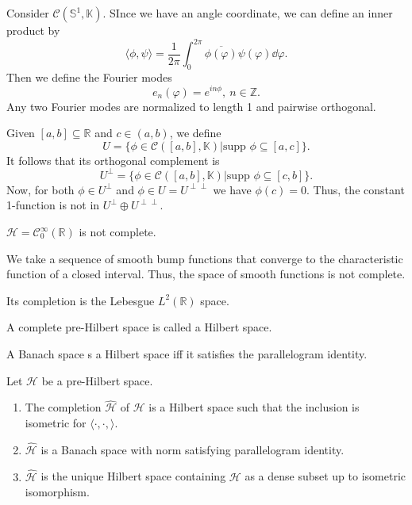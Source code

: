\documentclass[prb,12pt]{revtex4-2}
\theoremstyle{definition}
\theoremstyle{definition}
\theoremstyle{definition}
\newenvironment{parts}{\begin{enumerate}[label=(\alph*)]}{\end{enumerate}}
\newcommand{\R}{\mathbb{R}}
\newcommand{\Z}{\mathbb{Z}}
\begin{document}
\begin{Example}
	Consider $\mathcal{C}(\mathbb{S}^1, \mathbb{K})$. SInce we have an angle coordinate, we can define an inner product by
	\[
		\langle \phi, \psi\rangle = \frac{1}{2\pi}\int_0^{2\pi} \overline{\phi(\varphi)}\psi(\varphi)\dd{\varphi}
	.\] 
	Then we define the Fourier modes
	\[
		e_n(\varphi) = e^{in\phi},~n\in \Z
	.\] 
	Any two Fourier modes are normalized to length 1 and pairwise orthogonal. 
\end{Example}
\begin{Example}
	Given $[a,b]\subseteq \R$ and $c\in (a,b)$, we define
	\[
		U=\{\phi\in \mathcal{C}([a,b], \mathbb{K})|\text{supp }\phi \subseteq [a,c]\} 
	.\] 
	It follows that its orthogonal complement is
	\[
		U^\perp = \{\phi\in \mathcal{C}([a,b], \mathbb{K})|\text{supp }\phi\subseteq [c,b]\}
	.\] 
	Now, for both $\phi\in U^\perp$ and $\phi \in U=U^{\perp\perp}$ we have $\phi(c)=0$. Thus, the constant 1-function is not in $U^\perp \oplus U^{\perp\perp}$.
\end{Example}
\begin{Example}
	$\mathcal{H}=\mathcal{C}_0^\infty(\R)$ is not complete.

	We take a sequence of smooth bump functions that converge to the characteristic function of a closed interval. Thus, the space of smooth functions is not complete.

	Its completion is the Lebesgue $L^2(\R)$ space.
\end{Example}
\begin{Definition}
	A complete pre-Hilbert space is called a Hilbert space.
\end{Definition}
\begin{Corollary}
	A Banach space s a Hilbert space iff it satisfies the parallelogram identity.
\end{Corollary}
\begin{Theorem}
	Let $\mathcal{H}$ be a pre-Hilbert space. 
	\begin{parts}
	\item The completion $\hat{\mathcal{H}}$ of $\mathcal{H}$ is a Hilbert space such that the inclusion is isometric for $\langle \cdot, \cdot, \rangle$.
	\item $\hat{\mathcal{H}}$ is a Banach space with norm satisfying parallelogram identity.
	\item $\hat{\mathcal{H}}$ is the unique Hilbert space containing $\mathcal{H}$ as a dense subset up to isometric isomorphism.
	\end{parts}
\end{Theorem}
\end{document}
